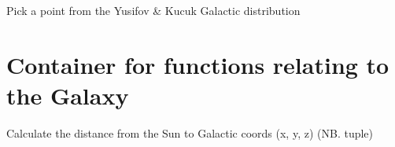 \documentclass[letterpaper,10pt,english]{sphinxmanual}
\begin{document}

\begin{fulllineitems}
\label{\detokenize{module-level-docs:radialmodels.ykr}}
\pysigstartsignatures
\pysiglinewithargsret
{}
{}
{}
\pysigstopsignatures
\sphinxAtStartPar
Pick a point from the Yusifov \& Kucuk Galactic distribution

\end{fulllineitems}



\section{{\hyperref[\detokenize{module-level-docs:module-galacticops}]{}} \textendash{} Container for functions relating to the Galaxy}
\label{\detokenize{module-level-docs:module-galacticops}}\label{\detokenize{module-level-docs:galacticops-container-for-functions-relating-to-the-galaxy}}\label{\detokenize{module-level-docs:galacticops-module-docs}}

\begin{fulllineitems}
\label{\detokenize{module-level-docs:galacticops.GalacticOps}}
\pysigstartsignatures
\pysigline
{}
\pysigstopsignatures
\end{fulllineitems}


\begin{fulllineitems}
\label{\detokenize{module-level-docs:galacticops.calc_dtrue}}
\pysigstartsignatures
\pysiglinewithargsret
{}
{\sphinxparamcomma {}\sphinxparamcomma {}}
{}
\pysigstopsignatures
\sphinxAtStartPar
Calculate the distance from the Sun to Galactic coords (x, y, z) (NB. tuple)

\end{fulllineitems}
\end{document}
